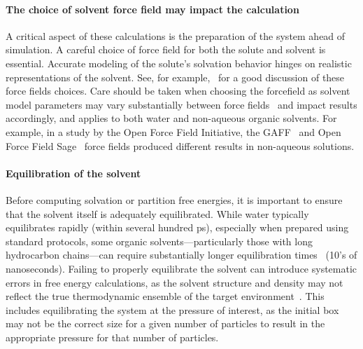 \documentclass[9pt,bestpractices]{livecoms}
\begin{document}
\paragraph{The choice of solvent force field may impact the calculation}
A critical aspect of these calculations is the preparation of the system ahead of simulation.  A careful choice of force field for both the solute and solvent is essential.  Accurate modeling of the solute's solvation behavior hinges on realistic representations of the solvent. See, for example,~\cite{bosisio2016blinded,rustenburg2016measuring} for a good discussion of these force fields choices.  Care should be taken when choosing the forcefield as solvent model parameters may vary substantially between force fields~\cite{jambeck2003, kadaoluwa_2021, mobley_2007charge} and impact results accordingly, and applies to both water and non-aqueous organic solvents. For example, in a study by the Open Force Field Initiative, the  GAFF~\cite{wang2004gaff} and Open Force Field Sage~\cite{boothroyd2023sage} force fields produced different results in non-aqueous solutions. 

\paragraph{Equilibration of the solvent}
Before computing solvation or partition free energies, it is important to ensure that the solvent itself is adequately equilibrated. While water typically equilibrates rapidly (within several hundred ps), especially when prepared using standard protocols, some organic solvents—particularly those with long hydrocarbon chains—can require substantially longer equilibration times~\cite{fan2021sampl7} (10's of nanoseconds). Failing to properly equilibrate the solvent can introduce systematic errors in free energy calculations, as the solvent structure and density may not reflect the true thermodynamic ensemble of the target environment~\cite{zhang2017solventmodel}. This includes equilibrating the system at the pressure of interest, as the initial box may not be the correct size for a given number of particles to result in the appropriate pressure for that number of particles. 
\end{document}
